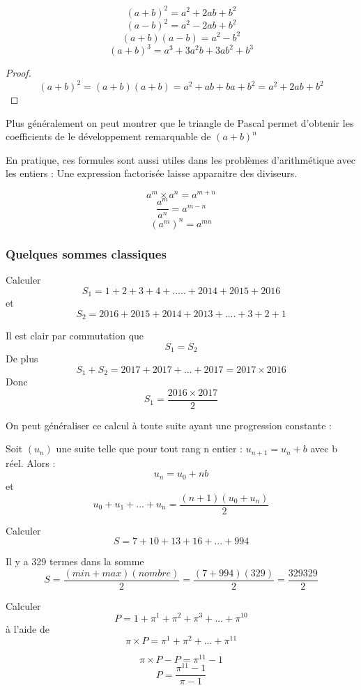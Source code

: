 \begin{prop} $$(a+b)^2 = a^2 +2ab + b^2$$
	$$(a-b)^2 = a^2 - 2ab + b^2$$
	$$(a+b)(a-b) = a^2 - b^2$$
	$$(a+b)^3 = a^3 +3a^{2}b + 3ab^{2} + b^3$$
\end{prop}
\begin{proof}
	$$(a+b)^2 = (a+b)(a+b) = a^2 +ab+ ba + b^2 = a^2 +2ab +b^2$$
\end{proof}

Plus généralement on peut montrer que le triangle de Pascal permet d'obtenir les coefficients de le développement remarquable de $(a+b)^n$

En pratique, ces formules sont aussi utiles dans les problèmes d'arithmétique avec les entiers : Une expression factorisée laisse apparaitre des diviseurs.

\par\medskip
\begin{prop} $$a^m \times a^n = a^{m+n}$$
$$\frac{a^m}{a^n}=a^{m-n}$$
$$ (a^m)^n = a^{mn}$$
\end{prop}
\par\medskip

\subsubsection{Quelques sommes classiques}

\begin{exo}
	Calculer $$ S_1= 1+2+3+4+.....+2014+2015+2016$$
	et $$S_2 = 2016+2015+2014+2013+....+3+2+1$$
\end{exo}
\begin{sol}
	Il est clair par commutation que $$ S_1= S_2 $$ 
	De plus $$S_1 + S_2 = 2017+ 2017 + ... +2017= 2017\times 2016$$
	Donc $$S_1=\frac{2016\times2017}{2}$$
\end{sol}

On peut généraliser ce calcul à toute suite ayant une progression constante : 

\begin{prop}
	Soit $(u_n)$ une suite telle que pour tout rang n entier : $u_{n+1} = u_n + b$ avec b réel. 
	Alors :$$u_n = u_0 + nb$$
	et $$ u_0 + u_1 + ... + u_n = \frac{(n+1)(u_0 + u_n)}{2}$$
\end{prop}

\begin{exo}
	Calculer $$ S=7+10+13+16+...+994$$
\end{exo}
\begin{sol}
	Il y a 329 termes dans la somme
	$$S= \frac{(min + max)(nombre)}{2}=  \frac{(7 + 994)(329)}{2}=\frac{329329}{2}$$
\end{sol}
\begin{exo}
	Calculer $$ P= 1+ \pi^1 + \pi^2 + \pi^3 +...+ \pi^{10}$$
à l'aide de $$\pi\times P=\pi^1 + \pi^2 +...+ \pi^{11} $$
\end{exo}
\begin{sol}
	$$\pi\times P - P = \pi^{11} - 1 $$
	$$P = \frac{\pi^{11} - 1}{\pi - 1}$$
\end{sol}

